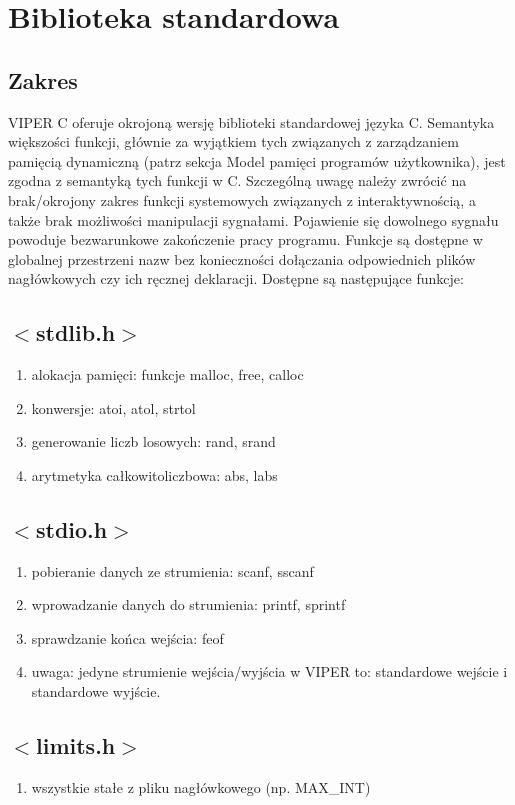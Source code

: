 \documentclass[a4paper,twoside,openright,11pt]{report}
\begin{document}
  \section {Biblioteka standardowa}
  \subsection {Zakres}
  \par VIPER C oferuje okrojoną wersję biblioteki standardowej języka C. Semantyka większości funkcji, głównie za wyjątkiem tych związanych z zarządzaniem pamięcią dynamiczną (patrz sekcja Model pamięci programów użytkownika), jest zgodna z semantyką tych funkcji w C. Szczególną uwagę należy zwrócić na brak/okrojony zakres funkcji systemowych związanych z interaktywnością, a także brak możliwości manipulacji sygnałami. Pojawienie się dowolnego sygnału powoduje bezwarunkowe zakończenie pracy programu. Funkcje są dostępne w globalnej przestrzeni nazw bez konieczności dołączania odpowiednich plików nagłówkowych czy ich ręcznej deklaracji. Dostępne są następujące funkcje:

  \subsection {$<$stdlib.h$>$}
    \begin{enumerate}
      \item alokacja pamięci: funkcje malloc, free, calloc
      \item konwersje: atoi, atol, strtol
      \item generowanie liczb losowych: rand, srand
      \item arytmetyka całkowitoliczbowa: abs, labs
    \end{enumerate}
  \subsection {$<$stdio.h$>$}
    \begin{enumerate}
      \item pobieranie danych ze strumienia: scanf, sscanf
      \item wprowadzanie danych do strumienia: printf, sprintf
      \item sprawdzanie końca wejścia: feof
      \item uwaga: jedyne strumienie wejścia/wyjścia w VIPER to: standardowe wejście i standardowe wyjście.
    \end{enumerate}
  \subsection {$<$limits.h$>$}
    \begin{enumerate}
      \item wszystkie stałe z pliku nagłówkowego (np. MAX\_INT)
    \end{enumerate}
\end{document}
